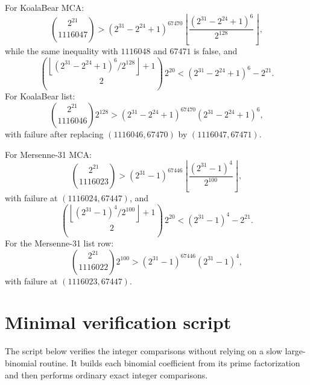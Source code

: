 \documentclass[11pt]{article}
\theoremstyle{definition}
\theoremstyle{remark}
\newcommand{\floor}[1]{\left\lfloor #1\right\rfloor}
\begin{document}
For KoalaBear MCA:
\[
        \binom{2^{21}}{1116047}>
        (2^{31}-2^{24}+1)^{67470}
        \left\lfloor\frac{(2^{31}-2^{24}+1)^6}{2^{128}}\right\rfloor,
\]
while the same inequality with \(1116048\) and \(67471\) is false, and
\[
        \binom{\floor{(2^{31}-2^{24}+1)^6/2^{128}}+1}{2}\,2^{20}
        <(2^{31}-2^{24}+1)^6-2^{21}.
\]
For KoalaBear list:
\[
        \binom{2^{21}}{1116046}2^{128}>
        (2^{31}-2^{24}+1)^{67470}(2^{31}-2^{24}+1)^6,
\]
with failure after replacing \((1116046,67470)\) by \((1116047,67471)\).

For Mersenne-31 MCA:
\[
        \binom{2^{21}}{1116023}>
        (2^{31}-1)^{67446}
        \left\lfloor\frac{(2^{31}-1)^4}{2^{100}}\right\rfloor,
\]
with failure at \((1116024,67447)\), and
\[
        \binom{\floor{(2^{31}-1)^4/2^{100}}+1}{2}\,2^{20}
        <(2^{31}-1)^4-2^{21}.
\]
For the Mersenne-31 list row:
\[
        \binom{2^{21}}{1116022}2^{100}>
        (2^{31}-1)^{67446}(2^{31}-1)^4,
\]
with failure at \((1116023,67447)\).

\section{Minimal verification script}\label{app:script}

The script below verifies the integer comparisons without relying on a slow
large-binomial routine.  It builds each binomial coefficient from its prime
factorization and then performs ordinary exact integer comparisons.
\end{document}
